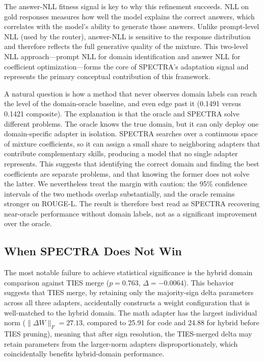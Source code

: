 \documentclass[preprint,12pt]{elsarticle}
\begin{document}
The answer-NLL fitness signal is key to why this refinement succeeds. NLL on
gold responses measures how well the model explains the correct answers, which
correlates with the model's ability to generate those answers. Unlike
prompt-level NLL (used by the router), answer-NLL is sensitive to the response
distribution and therefore reflects the full generative quality of the mixture.
This two-level NLL approach---prompt NLL for domain identification and answer
NLL for coefficient optimization---forms the core of SPECTRA's adaptation
signal and represents the primary conceptual contribution of this framework.

A natural question is how a method that never observes domain labels can
reach the level of the domain-oracle baseline, and even edge past it
(0.1491 versus 0.1421 composite). The explanation is that the oracle and
SPECTRA solve different problems. The oracle knows the true domain, but it can
only deploy one domain-specific adapter in isolation. SPECTRA searches over a
continuous space of mixture coefficients, so it can assign a small share to
neighboring adapters that contribute complementary skills, producing a model
that no single adapter represents. This suggests that identifying the correct
domain and finding the best coefficients are separate problems, and that
knowing the former does not solve the latter. We nevertheless treat the margin
with caution: the 95\% confidence intervals of the two methods overlap
substantially, and the oracle remains stronger on ROUGE-L. The result is
therefore best read as SPECTRA recovering near-oracle performance without
domain labels, not as a significant improvement over the oracle.

\subsection{When SPECTRA Does Not Win}

The most notable failure to achieve statistical significance is the hybrid
domain comparison against TIES merge ($p = 0.763$, $\Delta = -0.0064$). This
behavior suggests that TIES merge, by retaining only the majority-sign delta
parameters across all three adapters, accidentally constructs a weight
configuration that is well-matched to the hybrid domain. The math adapter
has the largest individual norm ($\|\Delta W\|_F = 27.13$, compared to 25.91
for code and 24.88 for hybrid before TIES pruning), meaning that after sign
resolution, the TIES-merged delta may retain parameters from the larger-norm
adapters disproportionately, which coincidentally benefits hybrid-domain
performance.
\end{document}
